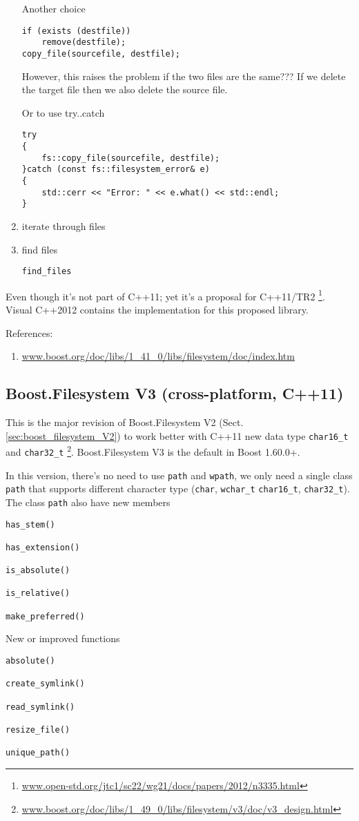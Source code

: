\begin{enumerate}
Another choice
\begin{verbatim}
if (exists (destfile))
	remove(destfile);
copy_file(sourcefile, destfile);	
\end{verbatim}
However, this raises the problem if the two files are the same??? If we delete
the target file then we also delete the source file.

Or to use try..catch
\begin{verbatim}
try
{
	fs::copy_file(sourcefile, destfile);
}catch (const fs::filesystem_error& e)
{
	std::cerr << "Error: " << e.what() << std::endl;
}
\end{verbatim}

   \item iterate through files
   
   \item find files
\begin{verbatim}
find_files
\end{verbatim}
\end{enumerate}


Even though it's not part of C++11; yet it's a proposal for C++11/TR2
\footnote{\url{www.open-std.org/jtc1/sc22/wg21/docs/papers/2012/n3335.html}}.
Visual C++2012 contains the implementation for this proposed library.

References:
\begin{enumerate}
  \item \url{www.boost.org/doc/libs/1_41_0/libs/filesystem/doc/index.htm}
\end{enumerate}

\subsection{Boost.Filesystem V3 (cross-platform, C++11)}
\label{sec:boost_filesystem_V3}

This is the major revision of Boost.Filesystem V2
(Sect.\ref{sec:boost_filesystem_V2}) to work better with C++11 new data type
\verb!char16_t! and \verb!char32_t!
\footnote{\url{www.boost.org/doc/libs/1_49_0/libs/filesystem/v3/doc/v3_design.html}}.
Boost.Filesystem V3 is the default in Boost 1.60.0+.

In this version, there's no need to use \verb!path! and \verb!wpath!, we only
need a single class \verb!path! that supports different character type
(\verb!char!, \verb!wchar_t! \verb!char16_t!, \verb!char32_t!).
The class \verb!path! also have new members
\begin{verbatim}
has_stem()

has_extension()

is_absolute()

is_relative()

make_preferred()
\end{verbatim}
New or improved functions
\begin{verbatim}
absolute()

create_symlink()

read_symlink()

resize_file()

unique_path()
\end{verbatim}

